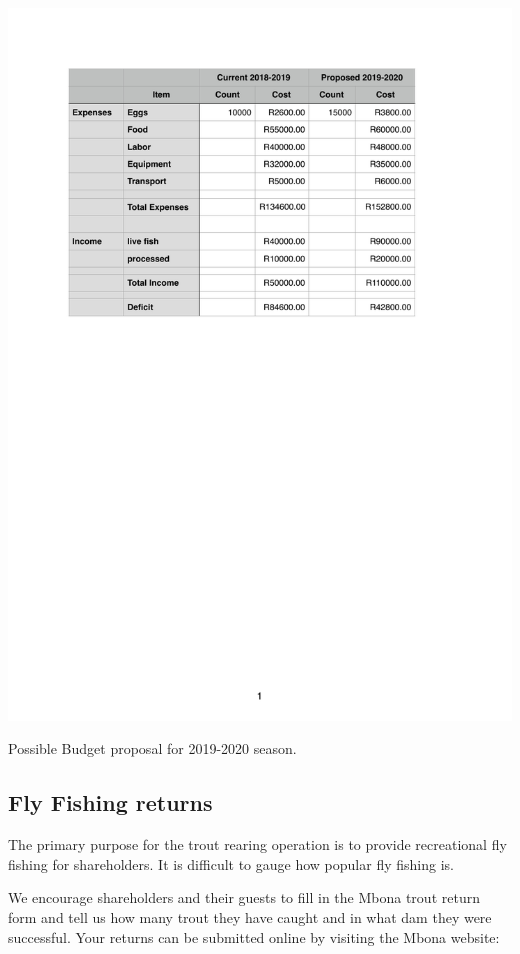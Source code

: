\begin{table}[H]
  \centering
  \includegraphics[scale = 0.9]{tables/TablesBudget.pdf}
   \caption{Possible Budget proposal for 2019-2020 season.}
  \label{tab:Budget}
\end{table}
 

\subsection{Fly Fishing returns}

The primary purpose for the trout rearing operation is to provide recreational
fly fishing for shareholders. It is difficult to gauge how popular fly fishing is. 

We encourage shareholders
and their guests to fill in the Mbona trout return form and tell us how many trout they have
caught and in what dam they were successful. Your returns can be submitted online
by visiting the Mbona website: 

